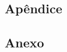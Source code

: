 \documentclass[
	article,			%
	11pt,				%
	oneside,			%
	a4paper,			%
	english,			%
	brazil,				%
	sumario=tradicional
	]{abntex2}
\begin{document}



%
%


\begin{apendicesenv}

\chapter{Apêndice}

\end{apendicesenv}

\begin{anexosenv}

\chapter{Anexo}


\end{anexosenv}
\end{document}
